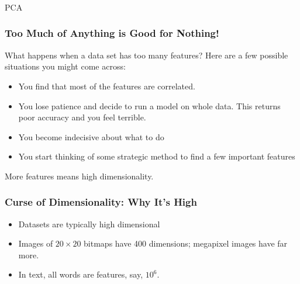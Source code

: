 \begin{frame}[fragile]\frametitle{}
\begin{center}
{\Large PCA}
\end{center}
\end{frame}

\begin{frame}[fragile]\frametitle{Too Much of Anything is Good for Nothing!}
What happens when a data set has too many features? Here are a few possible situations you might come across:
\begin{itemize}
\item  You find that most of the features are correlated.
\item  You lose patience and decide to run a model on whole data. This returns poor accuracy and you feel terrible.
\item  You become indecisive about what to do
\item  You start thinking of some strategic method to find a few important features
\end{itemize}

More features means high dimensionality.

\end{frame}



\begin{frame}[fragile]\frametitle{Curse of Dimensionality: Why It's High}
\begin{itemize}
\item  Datasets are typically high dimensional
 \item Images of $20 \times 20$ bitmaps have 400 dimensions; megapixel images have far more.
 \item In text, all words are features, say, $10^6$.
\end{itemize}
\end{frame}


